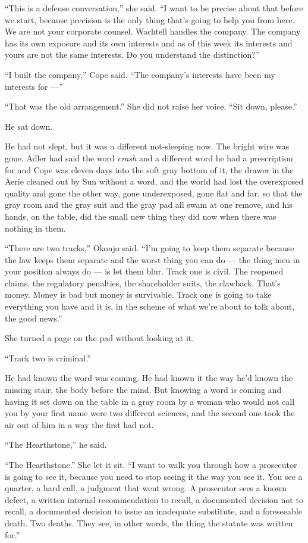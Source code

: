 \documentclass[11pt,openany]{book}
\newcommand{\scenebreak}{\par\vspace{0.5\baselineskip}\begin{center}\textasteriskcentered\quad\textasteriskcentered\quad\textasteriskcentered\end{center}\vspace{0.5\baselineskip}\par}
\begin{document}
``This is a defense conversation,'' she said. ``I want to be precise about that before we start, because precision is the only thing that's going to help you from here. We are not your corporate counsel. Wachtell handles the company. The company has its own exposure and its own interests and as of this week its interests and yours are not the same interests. Do you understand the distinction?''

``I built the company,'' Cope said. ``The company's interests have been my interests for ---''

``That was the old arrangement.'' She did not raise her voice. ``Sit down, please.''

He sat down.

He had not slept, but it was a different not-sleeping now. The bright wire was gone. Adler had said the word \textit{crash} and a different word he had a prescription for and Cope was eleven days into the soft gray bottom of it, the drawer in the Aerie cleaned out by Sun without a word, and the world had lost the overexposed quality and gone the other way, gone underexposed, gone flat and far, so that the gray room and the gray suit and the gray pad all swam at one remove, and his hands, on the table, did the small new thing they did now when there was nothing in them.

``There are two tracks,'' Okonjo said. ``I'm going to keep them separate because the law keeps them separate and the worst thing you can do --- the thing men in your position always do --- is let them blur. Track one is civil. The reopened claims, the regulatory penalties, the shareholder suits, the clawback. That's money. Money is bad but money is survivable. Track one is going to take everything you have and it is, in the scheme of what we're about to talk about, the good news.''

She turned a page on the pad without looking at it.

``Track two is criminal.''


\scenebreak


He had known the word was coming. He had known it the way he'd known the missing stair, the body before the mind. But knowing a word is coming and having it set down on the table in a gray room by a woman who would not call you by your first name were two different sciences, and the second one took the air out of him in a way the first had not.

``The Hearthstone,'' he said.

``The Hearthstone.'' She let it sit. ``I want to walk you through how a prosecutor is going to see it, because you need to stop seeing it the way you see it. You see a quarter, a hard call, a judgment that went wrong. A prosecutor sees a known defect, a written internal recommendation to recall, a documented decision not to recall, a documented decision to issue an inadequate substitute, and a foreseeable death. Two deaths. They see, in other words, the thing the statute was written for.''
\end{document}
